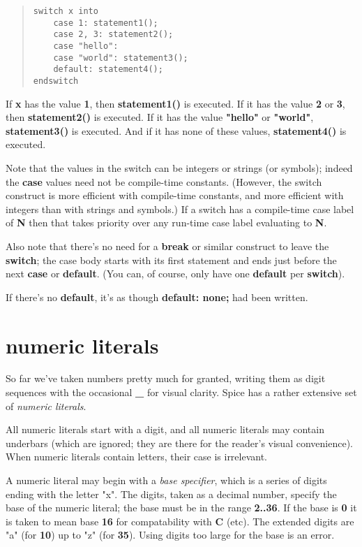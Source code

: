 \documentclass{report}
\begin{document}
\begin{quote}
\begin{verbatim}
switch x into
    case 1: statement1();
    case 2, 3: statement2();
    case "hello":
    case "world": statement3();
    default: statement4();
endswitch
\end{verbatim}
\end{quote}


If {\bf x} has the value {\bf 1}, then {\bf statement1()} is executed. If it has the value
{\bf 2} or {\bf 3}, then {\bf statement2()} is executed. If it has the value {\bf "hello"} or
{\bf "world"}, {\bf statement3()} is executed. And if it has none of these values,
{\bf statement4()} is executed.

Note that the values in the switch can be integers or strings (or symbols);
indeed the {\bf case} values need not be compile-time constants. (However, the
switch construct is more efficient with compile-time constants, and more
efficient with integers than with strings and symbols.) If a switch has a
compile-time case label of {\bf N} then that takes priority over any run-time case
label evaluating to {\bf N}.

Also note that there's no need for a {\bf break} or similar construct to leave the
{\bf switch}; the case body starts with its first statement and ends just before
the next {\bf case} or {\bf default}. (You can, of course, only have one
{\bf default} per {\bf switch}).

If there's no {\bf default}, it's as though {\bf default: none;} had been written.
\chapter{numeric literals}


So far we've taken numbers pretty much for granted, writing them as digit
sequences with the occasional {\bf \_} for visual clarity. Spice has a rather
extensive set of {\em numeric literals}.

All numeric literals start with a digit, and all numeric literals may
contain underbars (which are ignored; they are there for the reader's visual
convenience). When numeric literals contain letters, their case is
irrelevant.

A numeric literal may begin with a {\em base specifier}, which is a series of
digits ending with the letter "x". The digits, taken as a decimal number,
specify the base of the numeric literal; the base must be in the range
{\bf 2..36}. If the base is {\bf 0} it is taken to mean base {\bf 16} for compatability
with {\bf C} (etc). The extended digits are "a" (for {\bf 10}) up to "z" (for {\bf 35}).
Using digits too large for the base is an error.
\end{document}
